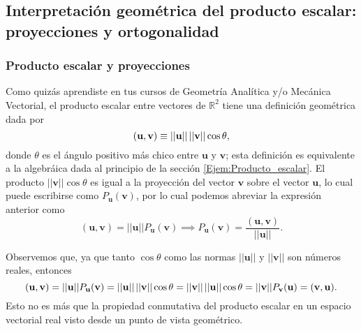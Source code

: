 \documentclass[12pt]{article}
\begin{document}
\subsection{Interpretación geométrica del producto escalar: proyecciones y ortogonalidad}\label{Subsec:Interpretación_geométrica_del_producto_escalar} 

\subsubsection{Producto escalar y proyecciones} \label{Subsec:Producto_escalar_y_proyecciones}

Como quizás aprendiste en tus cursos de Geometría Analítica y/o Mecánica Vectorial, el producto escalar entre vectores de $\mathbb{R}^2$ tiene una definición geométrica dada por $$(\mathbf{u},\mathbf{v})\equiv ||\mathbf{u}||\hspace{0.5mm}||\mathbf{v}||\cos{\theta},$$ \noindent donde $\theta$ es el ángulo positivo más chico entre $\mathbf{u}$ y $\mathbf{v}$; esta definición es equivalente a la algebráica dada al principio de la sección \ref{Ejem:Producto_escalar}. El producto $||\mathbf{v}||\cos{\theta}$ es igual a la proyección del vector $\mathbf{v}$ sobre el vector $\mathbf{u}$, lo cual puede escribirse como $P_{\mathbf{u}}(\mathbf{v})$, por lo cual podemos abreviar la expresión anterior como $$(\mathbf{u},\mathbf{v})=||\mathbf{u}||P_{\mathbf{u}}(\mathbf{v}) \implies P_{\mathbf{u}}(\mathbf{v})=\frac{(\mathbf{u},\mathbf{v})}{||\mathbf{u}||}.$$ 

Observemos que, ya que tanto $\cos\theta$ como las normas $||\mathbf{u}||$ y $||\mathbf{v}||$ son números reales, entonces $$(\mathbf{u},\mathbf{v})=||\mathbf{u}||P_{\mathbf{u}}(\mathbf{v})=||\mathbf{u}||\hspace{0.5mm}||\mathbf{v}||\cos\theta = ||\mathbf{v}||\hspace{0.5mm}||\mathbf{u}||\cos\theta=||\mathbf{v}||P_{\mathbf{v}}(\mathbf{u})=(\mathbf{v},\mathbf{u}).$$\noindent Esto no es más que la propiedad conmutativa del producto escalar en un espacio vectorial real \textemdash visto desde un punto de vista geométrico.
\end{document}
